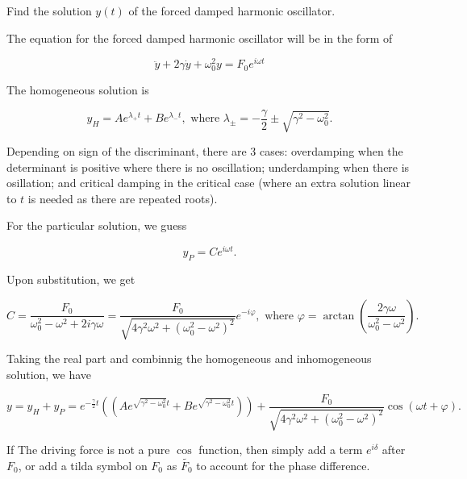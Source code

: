 \documentclass[english,a4paper,12pt]{report}
\begin{document}
{Find the solution \(y(t)\) of the forced damped harmonic oscillator.}
{The equation for the forced damped harmonic oscillator will be in the form of 

\begin{equation}
    \ddot{y} + 2\gamma \dot{y} + \omega _{0} ^2 y = F_0 e^{i \omega t}   
\end{equation}

The homogeneous solution is 

\begin{equation}
    y_{H} = Ae^{\lambda _{+} t} + Be^{\lambda _{-}t }, \text{ where } \lambda _{\pm } = -\frac{\gamma }{2} \pm \sqrt{\gamma ^2 - \omega _{0}^2 }.        
\end{equation}

Depending on sign of the discriminant, there are 3 cases: overdamping when the determinant is positive where there is no oscillation; underdamping when there is osillation; and critical damping in the critical case (where an extra solution linear to \(t\) is needed as there are repeated roots). 

For the particular solution, we guess

\begin{equation}
    y_{P} = Ce^{i \omega t}.  
\end{equation}

Upon substitution, we get

\begin{equation}
    C = \frac{F_0 }{\omega _{0}^2 -\omega ^2 + 2i\gamma \omega  } = \frac{F_0 }{\sqrt{4\gamma ^2\omega ^2+ (\omega _{0}^2 - \omega ^2)^2} }e^{-i\varphi }, \text{ where }  \varphi = \arctan \left({\frac{2\gamma \omega }{\omega _{0}^2 - \omega ^2 }}\right).    
\end{equation}

Taking the real part and combinnig the homogeneous and inhomogeneous solution, we have

\begin{equation}
    y = y_{H} + y_{P} = e^{-\frac{\gamma }{2}t } ((Ae^{ \sqrt{\gamma ^2 - \omega _{0}^2 } t } + Be^{ \sqrt{\gamma ^2 - \omega _{0}^2 } t } )) + \frac{F_0 }{\sqrt{4\gamma ^2\omega ^2+ (\omega _{0}^2 - \omega ^2 )^2} } \cos  (\omega t+\varphi ).
\end{equation}

If The driving force is not a pure \(\cos \) function, then simply add a term \(e^{i \delta } \) after \(F_0 \), or add a tilda symbol on \(F_0 \) as \(\tilde{F_0 } \) to account for the phase difference. 

}
\end{document}
